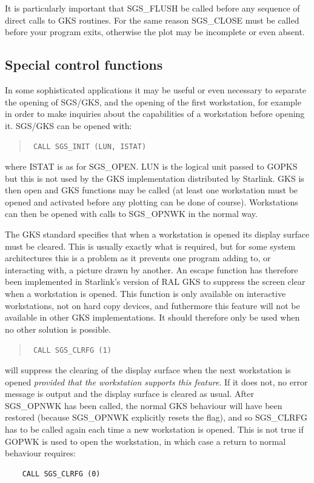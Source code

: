 \documentclass[11pt]{article}
\newcommand{\htmlref}[2]{#1}
\begin{document}
It is particularly important that SGS\_FLUSH be called
before any sequence of direct calls to GKS routines.
For the same reason
\htmlref{SGS\_CLOSE}{SGS_CLOSE} must be called before your program exits,
otherwise the plot may be incomplete or even absent.

\subsection {Special control functions}\label{sec-special}

In some sophisticated applications it may be useful or even necessary to
separate the opening of SGS/GKS, and the opening of the first workstation,
for example in order to make inquiries about the capabilities of a workstation
before opening it. SGS/GKS can be opened with:
\begin{quote}{\tt
    CALL \htmlref{SGS\_INIT}{SGS_INIT} (LUN, ISTAT)}
\end{quote}
where ISTAT is as for \htmlref{SGS\_OPEN}{SGS_OPEN}. LUN is the logical
unit passed to GOPKS but this is not used by the GKS implementation
distributed by Starlink.
GKS is then open and GKS functions
may be called (at least one workstation must be opened and activated before
any plotting can be done of course). Workstations can then be opened with
calls to \htmlref{SGS\_OPNWK}{SGS_OPNWK} in the normal way.

The GKS standard specifies that when a workstation is opened its display
surface must be cleared. This is usually exactly what is required, but for
some system architectures this is a problem as it prevents one program adding
to, or interacting with, a picture drawn by another. An escape function
has therefore been implemented in Starlink's version of RAL GKS to suppress
the screen clear when a workstation is opened. This function is only available
on interactive workstations, not on hard copy devices, and futhermore this
feature will not be available in other GKS implementations. It should therefore
only be used when no other solution is possible.
\begin{quote}{\tt
    CALL \htmlref{SGS\_CLRFG}{SGS_CLRFG} (1)}
\end{quote}
will suppress the clearing of the display surface when the next workstation is
opened {\em provided that the workstation supports this feature}.
If it does not,
no error message is output and the display surface is cleared as usual. After
SGS\_OPNWK has been called, the normal GKS behaviour will have been restored
(because SGS\_OPNWK explicitly resets the flag), and so SGS\_CLRFG has to be
called again each time a new workstation is opened. This is not true if GOPWK
is used to open the workstation, in which case a return to
normal behaviour requires:
\begin{verbatim}
    CALL SGS_CLRFG (0)
\end{verbatim}
\end{document}
